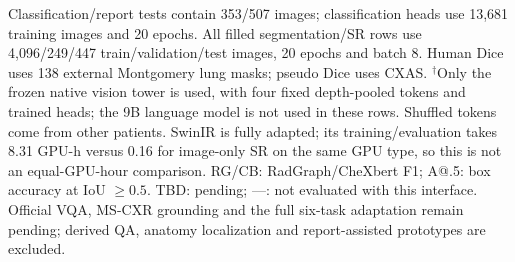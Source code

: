 \begin{table}[t]
\begin{minipage}{\linewidth}\fontsize{8}{9.5}\selectfont
Classification/report tests contain 353/507 images; classification heads use
13,681 training images and 20 epochs. All filled segmentation/SR rows use
4,096/249/447 train/validation/test images, 20 epochs and batch 8.
Human Dice uses 138 external Montgomery lung masks; pseudo Dice uses CXAS.
$^{\dagger}$Only the frozen native vision tower is used, with four fixed
depth-pooled tokens and trained heads; the 9B language model is not used in
these rows. Shuffled tokens come from other patients. SwinIR is fully adapted;
its training/evaluation takes 8.31 GPU-h versus 0.16 for image-only SR on the
same GPU type, so this is not an equal-GPU-hour comparison.
RG/CB: RadGraph/CheXbert F1; A@.5: box accuracy at IoU $\geq0.5$.
TBD: pending; ---: not evaluated with this interface. Official VQA, MS-CXR
grounding and the full six-task adaptation remain pending; derived QA, anatomy
localization and report-assisted prototypes are excluded.
\end{minipage}
\end{table}
